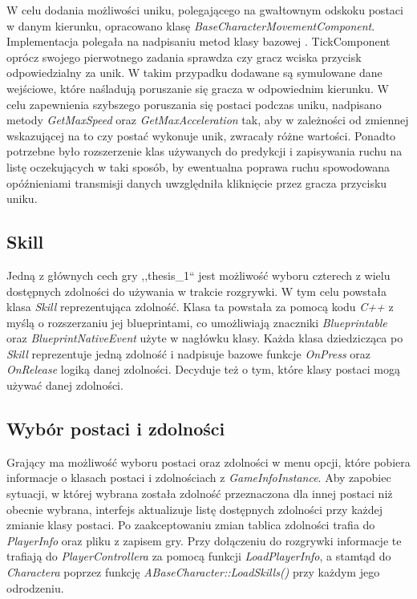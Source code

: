 \documentclass[multip]{SGGW-thesis}
\begin{document}
W celu dodania możliwości uniku, polegającego na gwałtownym odskoku postaci w danym kierunku, opracowano klasę {\em BaseCharacterMovementComponent}. Implementacja polegała na nadpisaniu metod klasy bazowej \cite{uewiki-charmovement}. TickComponent oprócz swojego pierwotnego zadania sprawdza czy gracz wciska przycisk odpowiedzialny za unik. W takim przypadku dodawane są symulowane dane wejściowe, które naśladują poruszanie się gracza w odpowiednim kierunku. W celu zapewnienia szybszego poruszania się postaci podczas uniku, nadpisano metody {\em GetMaxSpeed} oraz {\em GetMaxAcceleration} tak, aby w zależności od zmiennej wskazującej na to czy postać wykonuje unik, zwracały różne wartości. Ponadto potrzebne było rozszerzenie klas używanych do predykcji i zapisywania ruchu na listę oczekujących w taki sposób, by ewentualna poprawa ruchu spowodowana opóźnieniami transmisji danych uwzględniła kliknięcie przez gracza przycisku uniku.
\clearpage
	\subsection{Skill}
	Jedną z głównych cech gry ,,thesis\_1`` jest możliwość wyboru czterech z wielu dostępnych zdolności do używania w trakcie rozgrywki. W tym celu powstała klasa {\em Skill} reprezentująca zdolność. Klasa ta powstała za pomocą kodu {\em C++} z myślą o rozszerzaniu jej blueprintami, co umożliwiają znaczniki {\em Blueprintable} oraz {\em BlueprintNativeEvent} użyte w nagłówku klasy. Każda klasa dziedzicząca po {\em Skill} reprezentuje jedną zdolność i nadpisuje bazowe funkcje {\em OnPress} oraz {\em OnRelease} logiką danej zdolności. Decyduje też o tym, które klasy postaci mogą używać danej zdolności.
	\subsection{Wybór postaci i zdolności}
		\label{wybor-postaci}
	Grający ma możliwość wyboru postaci oraz zdolności w menu opcji, które pobiera informacje o klasach postaci i zdolnościach z {\em GameInfoInstance}. Aby zapobiec sytuacji, w której wybrana została zdolność przeznaczona dla innej postaci niż obecnie wybrana, interfejs aktualizuje listę dostępnych zdolności przy każdej zmianie klasy postaci. Po zaakceptowaniu zmian tablica zdolności trafia do {\em PlayerInfo} oraz pliku z zapisem gry. Przy dołączeniu do rozgrywki informacje te trafiają do {\em PlayerControllera} za pomocą funkcji {\em LoadPlayerInfo}, a stamtąd do {\em Charactera} poprzez funkcję {\em ABaseCharacter::LoadSkills()} przy każdym jego odrodzeniu.
\end{document}
